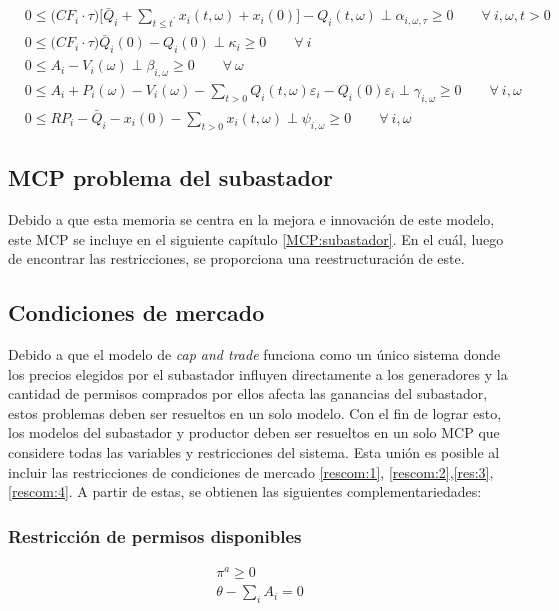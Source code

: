 \footnotesize{
\begin{align}
    & 0 \leq \big(CF_i \cdot \tau \big) \Bigg[\bar{Q}_i + \sum_{t\leq t^{\prime}} x_i(t,\omega) + x_i(0) \Bigg] - Q_i(t,\omega)  \perp \alpha_{i,\omega,\tau} \geq 0 \qquad \forall \ i, \omega, t  > 0\\
    & 0 \leq \Big(CF_i\cdot\tau \Big)\bar{Q}_i(0)-Q_{i}(0) \perp \kappa_i \geq 0 \qquad \forall \ i \\
    & 0 \leq  A_{i} - V_i(\omega) \perp \beta_{i,\omega} \geq 0 \qquad \forall  \ \omega \\
    & 0 \leq  A_{i} + P_{i} (\omega) - V_i(\omega) - \sum_{t>0} Q_i(t,\omega) \varepsilon_{i} -Q_i(0)\varepsilon_{i} \perp \gamma_{i,\omega} \geq 0 \qquad \forall \ i, \omega\\
    & 0 \leq  RP_i - \bar{Q}_i - x_i(0) - \sum_{t>0} x_i(t,\omega) \perp \psi_{i,\omega} \geq 0 \qquad \forall \ i,\omega 
\end{align}
}

\subsection{MCP problema del subastador}

Debido a que esta memoria se centra en la mejora e innovación de este modelo, este MCP se incluye en el siguiente capítulo \ref{MCP:subastador}. En el cuál, luego de encontrar las restricciones, se proporciona una reestructuración de este. 

\subsection{Condiciones de mercado}

Debido a que el modelo de \textit{cap and trade} funciona como un único sistema donde los precios elegidos por el subastador influyen directamente a los generadores y la cantidad de permisos comprados por ellos afecta las ganancias del subastador, estos problemas deben ser resueltos en un solo modelo. Con el fin de lograr esto, los modelos del subastador y productor deben ser resueltos en un solo MCP que considere todas las variables y restricciones del sistema. Esta unión es posible al incluir las restricciones de condiciones de mercado \ref{rescom:1}, \ref{rescom:2},\ref{res:3},\ref{rescom:4}. A partir de estas, se obtienen las siguientes complementariedades:

\subsubsection{Restricción de permisos disponibles}
\footnotesize{
\begin{align}
 \pi^a \geq 0 \\
 \theta - \sum_{i}A_i = 0  
\end{align}}

